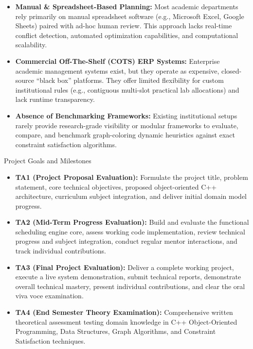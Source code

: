 \documentclass[11pt,a4paper]{article}
\newcommand{\blueheading}[1]{%
    {\sffamily\color{TitleBlue}\fontsize{15}{18}\selectfont #1}%
}
\newcommand{\answerbox}[2][]{%
    \vspace{2pt}\par
    \noindent
    {\itshape #2}\par
    \vspace{2pt}
}
\begin{document}
\answerbox{%
\begin{itemize}[leftmargin=*,noitemsep,topsep=2pt,itemsep=3pt]
    \item \textbf{Manual & Spreadsheet-Based Planning:} Most academic departments rely primarily on manual spreadsheet software (e.g., Microsoft Excel, Google Sheets) paired with ad-hoc human review. This approach lacks real-time conflict detection, automated optimization capabilities, and computational scalability.
    \item \textbf{Commercial Off-The-Shelf (COTS) ERP Systems:} Enterprise academic management systems exist, but they operate as expensive, closed-source ``black box'' platforms. They offer limited flexibility for custom institutional rules (e.g., contiguous multi-slot practical lab allocations) and lack runtime transparency.
    \item \textbf{Absence of Benchmarking Frameworks:} Existing institutional setups rarely provide research-grade visibility or modular frameworks to evaluate, compare, and benchmark graph-coloring dynamic heuristics against exact constraint satisfaction algorithms.
\end{itemize}
}

\vspace{5mm}

\blueheading{Project Goals and Milestones }

\vspace{1mm}


\answerbox{%
\begin{itemize}[leftmargin=*,noitemsep,topsep=2pt,itemsep=3pt]
    \textbf{Core Project Goal:} Design, implement, and evaluate an efficient, object-oriented C++ software engine that models institutional timetabling as a Constraint Satisfaction Problem (CSP) via graph coloring, integrating customizable heuristic strategies and soft-constraint local search optimization engines. The project will be evaluated through three project phases (TA1-TA3) and the End Semester Theory Examination (TA4).
    \item \textbf{TA1 (Project Proposal Evaluation):} Formulate the project title, problem statement, core technical objectives, proposed object-oriented C++ architecture, curriculum subject integration, and deliver initial domain model progress.
    \item \textbf{TA2 (Mid-Term Progress Evaluation):} Build and evaluate the functional scheduling engine core, assess working code implementation, review technical progress and subject integration, conduct regular mentor interactions, and track individual contributions.
    \item \textbf{TA3 (Final Project Evaluation):} Deliver a complete working project, execute a live system demonstration, submit technical reports, demonstrate overall technical mastery, present individual contributions, and clear the oral viva voce examination.
    \item \textbf{TA4 (End Semester Theory Examination):} Comprehensive written theoretical assessment testing domain knowledge in C++ Object-Oriented Programming, Data Structures, Graph Algorithms, and Constraint Satisfaction techniques.
\end{itemize}
}
\end{document}
